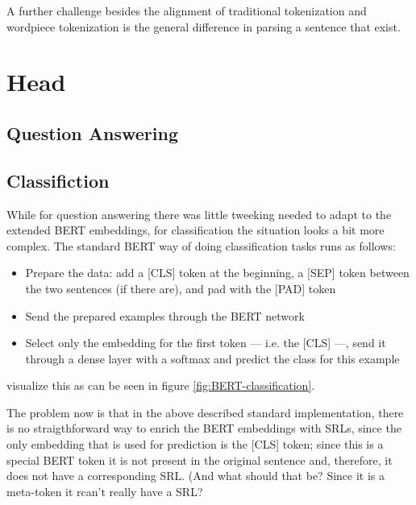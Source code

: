 A further challenge besides the alignment of traditional tokenization and wordpiece tokenization is
the general difference in parsing a sentence that exist.

\section{Head}

\subsection{Question Answering}

\subsection{Classifiction}

While for question answering there was little tweeking needed to adapt to the extended BERT
embeddings, for classification the situation looks a bit more complex. The standard BERT way
of doing classification tasks runs as follows:

\begin{itemize}
  \item Prepare the data: add a [CLS] token at the beginning, a [SEP] token between the two sentences (if there are), and pad with the [PAD] token
  \item Send the prepared examples through the BERT network
  \item Select only the embedding for the first token  --- i.e. the [CLS] ---, send it through a dense layer with a softmax and predict the class for this example
\end{itemize}

\cite{devlin2018bert} visualize this as can be seen in figure \ref{fig:BERT-classification}.



The problem now is that in the above described standard implementation, there
is no straigthforward way to enrich the BERT embeddings with SRLs, since the
only embedding that is used for prediction is the [CLS] token; since this is a
special BERT token it is not present in the original sentence and, therefore,
it does not have a corresponding SRL. (And what should that be? Since it is a
meta-token it rcan't really have a SRL?

